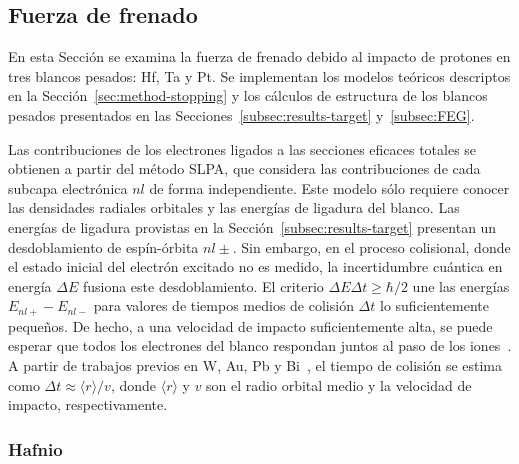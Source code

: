 \subsection{Fuerza de frenado}
\label{subsec:results-stopping}

En esta Sección se examina la fuerza de frenado debido al impacto de 
protones en tres blancos pesados: Hf, Ta y Pt. Se implementan los 
modelos teóricos descriptos en la Sección~\ref{sec:method-stopping} y los
cálculos de estructura de los blancos pesados presentados en las 
Secciones~\ref{subsec:results-target} y~\ref{subsec:FEG}.

Las contribuciones de los electrones ligados a las secciones eficaces 
totales se obtienen a partir del método SLPA, que considera las 
contribuciones de cada subcapa electrónica $nl$ de forma independiente.
Este modelo sólo requiere conocer las densidades radiales orbitales y
las energías de ligadura del blanco. Las energías de ligadura provistas
en la Sección~\ref{subsec:results-target} presentan un desdoblamiento de 
espín-órbita $nl\pm$. Sin embargo, en el proceso colisional, donde el 
estado inicial del electrón excitado no es medido, la incertidumbre 
cuántica en energía $\Delta E$ fusiona este desdoblamiento. El criterio 
$\Delta E\Delta t\geq\hbar/2$ une las energías $E_{nl+}-E_{nl-}$ para 
valores de tiempos medios de colisión $\Delta t$ lo suficientemente 
pequeños. De hecho, a una velocidad de impacto suficientemente alta, se 
puede esperar que todos los electrones del blanco respondan juntos al 
paso de los iones~\cite{Lindhard:53,Chu:72}. A partir de trabajos 
previos en W, Au, Pb y Bi~\cite{Montanari:09}, el tiempo de colisión se 
estima como $\Delta t\approx\langle r\rangle/v$, donde $\langle r\rangle$ 
y $v$ son el radio orbital medio y la velocidad de impacto, 
respectivamente.

\subsubsection{Hafnio}

